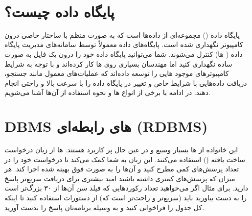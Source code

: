 \documentclass[]{article}
\begin{document}
\newpage
\pagestyle{fancy}
\fancyhf{}
\fancyfoot{}
\cfoot{\thepage}
\renewcommand{\headrulewidth}{2pt}

\KashidaOff


 \Large \textbf{\\
}




\section*{{\titr پایگاه داده چیست؟}}

پایگاه داده () مجموعه‌ای از داده‌ها است که به صورت منظم با ساختار خاصی درون کامپیوتر نگهداری شده است. پایگاه‌های داده معمولاً توسط سامانه‌های مدیریت پایگاه داده ( ها) کنترل می‌شوند. شما می‌توانید پایگاه داده خود را درون یک فایل به صورت ساده نگهداری کنید اما مهندسان بسیاری روی  ها کار کرده‌اند و با توجه به شرایط کامپیوتر‌های موجود  هایی را توسعه داده‌اند که عملیات‌های معمول مانند جستجو، دریافت داده‌هایی با شرایط خاص و تغییر در پایگاه داده را با سرعت بالا و راحتی انجام دهند. در ادامه با برخی از انواع  ها و نحوه استفاده از آن‌ها آشنا می‌شویم.



\section*{{\titr DBMS های رابطه‌ای (RDBMS)}}


این خانواده از  ها بسیار وسیع و در عین حال پر کاربرد هستند.  ها از زبان درخواست ساخت یافته () استفاده می‌کنند. این زبان به شما کمک می‌کند تا درخواست خود را در تعداد پرسش‌های کمی مطرح کنید و  آن‌ها را به صورت فوق بهینه شده اجرا کند. هر میزان که پرسش‌های کمتری داشته باشید امید بیشتری برای دریافت سریع‌تر پاسخ دارید. برای مثال اگر می‌خواهید تعداد رکورد‌هایی که فیلد سن آن‌ها از ۳۰ بزرگ‌تر است را به دست بیاورید باید (سریع‌تر و راحت‌تر است که) از دستورات  استفاده کنید تا اینکه کل جدول را فراخوانی کنید و به وسیله برنامه‌تان پاسخ را بدست آورید.
\end{document}
